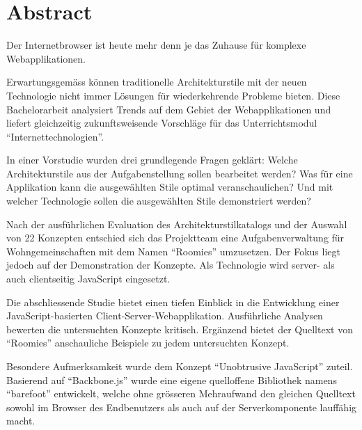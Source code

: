\clearpage
\thispagestyle{empty}

\section*{Abstract}

Der Internetbrowser ist heute mehr denn je das Zuhause für komplexe Webapplikationen.

Erwartungsgemäss können traditionelle Architekturstile mit der neuen Technologie nicht immer Lösungen für wiederkehrende Probleme bieten. Diese Bachelorarbeit analysiert Trends auf dem Gebiet der Webapplikationen und liefert gleichzeitig zukunftsweisende Vorschläge für das Unterrichtsmodul ``Internettechnologien''.

In einer Vorstudie wurden drei grundlegende Fragen geklärt: Welche Architekturstile aus der Aufgabenstellung sollen bearbeitet werden? Was für eine Applikation kann die ausgewählten Stile optimal veranschaulichen? Und mit welcher Technologie sollen die ausgewählten Stile demonstriert werden?

Nach der ausführlichen Evaluation des Architekturstilkatalogs und der Auswahl von 22 Konzepten entschied sich das Projektteam eine Aufgabenverwaltung für Wohngemeinschaften mit dem Namen ``Roomies'' umzusetzen. Der Fokus liegt jedoch auf der Demonstration der Konzepte. Als Technologie wird server- als auch clientseitig JavaScript eingesetzt.

Die abschliessende Studie bietet einen tiefen Einblick in die Entwicklung einer JavaScript-basierten Client-Server-Webapplikation. Ausführliche Analysen bewerten die untersuchten Konzepte kritisch. Ergänzend bietet der Quelltext von ``Roomies'' anschauliche Beispiele zu jedem untersuchten Konzept.

Besondere Aufmerksamkeit wurde dem Konzept ``Unobtrusive JavaScript'' zuteil. Basierend auf ``Backbone.js'' wurde eine eigene quelloffene Bibliothek namens ``barefoot'' entwickelt, welche ohne grösseren Mehraufwand den gleichen Quelltext sowohl im Browser des Endbenutzers als auch auf der Serverkomponente lauffähig macht.

\clearpage